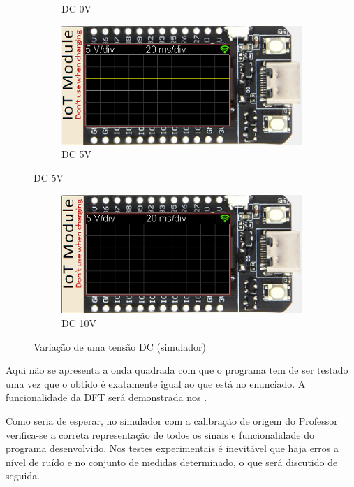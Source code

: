 \begin{figure}[H]
\begin{subfigure}{0.35\textwidth}
        \captionsetup{justification=centering}
        \caption{DC 0V}
        \label{fig:DC 0V simulador}
    \end{subfigure}
    \begin{subfigure}{0.35\textwidth}
        \centering
        \includegraphics[width=1\linewidth]{Imagens/Testes no simulador/DC 5V.png}
        \captionsetup{justification=centering}
        \caption{DC 5V}
        \label{fig:DC 5V simulador}
    \end{subfigure}
\end{figure}

\begin{figure}[H]\ContinuedFloat
    \centering
    \begin{subfigure}{0.35\textwidth}
        \centering
        \includegraphics[width=1\linewidth]{Imagens/Testes no simulador/DC 10V.png}
        \captionsetup{justification=centering}
        \caption{DC 10V}
        \label{fig:DC 10V simulador}
    \end{subfigure}
    \captionsetup{justification=centering}
    \caption{Variação de uma tensão DC (simulador)}
    \label{fig:Variação de uma tensão DC (simulador)}
\end{figure}

Aqui não se apresenta a onda quadrada com que o programa tem de ser testado uma vez que o obtido é exatamente igual ao que está no enunciado. A funcionalidade da DFT será demonstrada nos .

Como seria de esperar, no simulador com a calibração de origem do Professor verifica-se a correta representação de todos os sinais e funcionalidade do programa desenvolvido. Nos testes experimentais é inevitável que haja erros a nível de ruído e no conjunto de medidas determinado, o que será discutido de seguida.